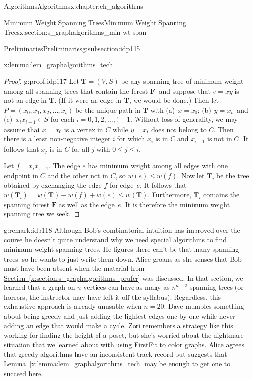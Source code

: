 \documentclass[oneside,10pt,]{book}
\newcommand{\xreffont}{\relax}
\numberwithin{equation}{section}
\newcommand{\bfF}{\mathbf{F}}
\newcommand{\bfT}{\mathbf{T}}
\begin{document}
\begin{chapterptx}{Algorithms}{}{Algorithms}{}{}{x:chapter:ch_algorithms}
\begin{sectionptx}{Minimum Weight Spanning Trees}{}{Minimum Weight Spanning Trees}{}{}{x:section:s_graphalgorithms_min-wt-span}
\begin{subsectionptx}{Preliminaries}{}{Preliminaries}{}{}{g:subsection:idp115}
\begin{lemma}{}{}{x:lemma:lem_graphalgorithms_tech}
\end{lemma}
\begin{proof}{}{g:proof:idp117}
Let \(\bfT=(V,S)\) be any spanning tree of minimum weight among all spanning trees that contain the forest \(\bfF\), and suppose that \(e=xy\) is not an edge in \(\bfT\). (If it were an edge in \(\bfT\), we would be done.) Then let \(P=(x_0,x_1,x_2,\dots,x_t)\) be the unique path in \(\bfT\) with (a)~\(x=x_0\); (b)~\(y=x_t\); and (c)~\(x_ix_{i+1}\in S\) for each \(i=0,1,2,\dots,t-1\). Without loss of generality, we may assume that \(x=x_0\) is a vertex in \(C\) while \(y=x_t\) does not belong to \(C\). Then there is a least non-negative integer \(i\) for which \(x_i\) is in \(C\) and \(x_{i+1}\) is not in \(C\). It follows that \(x_j\) is in \(C\) for all \(j\) with \(0\le j\le i\).%
\par
Let \(f=x_ix_{i+1}\). The edge \(e\) has minimum weight among all edges with one endpoint in \(C\) and the other not in \(C\), so \(w(e)\le w(f)\). Now let \(\bfT_i\) be the tree obtained by exchanging the edge \(f\) for edge~\(e\). It follows that \(w(\bfT_i) = w(\bfT) - w(f) +w(e)\le w(\bfT)\). Furthermore, \(\bfT_i\) contains the spanning forest \(\bfF\) as well as the edge~\(e\). It is therefore the minimum weight spanning tree we seek.%
\end{proof}
\begin{remark}{}{g:remark:idp118}%
Although Bob's combinatorial intuition has improved over the course he doesn't quite understand why we need special algorithms to find minimum weight spanning trees. He figures there can't be that many spanning trees, so he wants to just write them down. Alice groans as she senses that Bob must have been absent when the material from \hyperref[x:section:s_graphalgorithms_prufer]{Section~{\xreffont\ref{x:section:s_graphalgorithms_prufer}}} was discussed. In that section, we learned that a graph on \(n\) vertices can have as many as \(n^{n-2}\) spanning trees (or horrors, the instructor may have left it off the syllabus). Regardless, this exhaustive approach is already unusable when \(n = 20\). Dave mumbles something about being greedy and just adding the lightest edges one-by-one while never adding an edge that would make a cycle. Zori remembers a strategy like this working for finding the height of a poset, but she's worried about the nightmare situation that we learned about with using FirstFit to color graphs. Alice agrees that greedy algorithms have an inconsistent track record but suggests that \hyperref[x:lemma:lem_graphalgorithms_tech]{Lemma~{\xreffont\ref{x:lemma:lem_graphalgorithms_tech}}} may be enough to get one to succeed here.%

\end{remark}
\end{subsectionptx}
\end{sectionptx}
\end{chapterptx}
\end{document}
